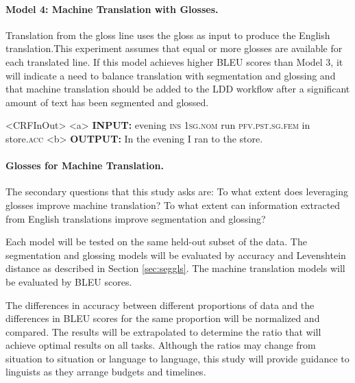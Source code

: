 \paragraph{Model 4: Machine Translation with Glosses.}

Translation from the gloss line uses the gloss as input to produce the English translation.This experiment assumes that equal or more glosses are available for each translated line. If this model achieves higher BLEU scores than Model 3, it will indicate a need to balance translation with segmentation and glossing and that machine translation should be added to the LDD workflow after a significant amount of text has been segmented and glossed. 

\begin{singlespace}
\pex<CRFInOut>   
\label{ex:FTgloss}
\a<a> \textbf{INPUT:} \hspace{5 mm} evening \textsc{ins} \textsc{1sg.nom} run \textsc{pfv.pst.sg.fem} in store.\textsc{acc}
\label{ex:FTglossIn}
\a<b> \textbf{OUTPUT:} \hspace{3 mm} In the evening I ran to the store.
\label{ex:FTglossOut}
\xe
\end{singlespace}


\paragraph{Glosses for Machine Translation.}
The secondary questions that this study asks are:
To what extent does leveraging glosses improve machine translation?  To what extent can information extracted from English translations improve segmentation and glossing?

Each model will be tested on the same held-out subset of the data. The segmentation and glossing models will be evaluated by accuracy and Levenshtein distance as described in Section \ref{sec:seggls}. The machine translation models will be evaluated by BLEU \cite{papineni_bleu:_2002} scores.  

The differences in accuracy between different proportions of data and the differences in BLEU scores for the same proportion will be normalized and compared. The results will be extrapolated to determine the ratio that will achieve optimal results on all tasks. 
Although the ratios may change from situation to situation or language to language, this study will provide guidance to linguists as they arrange budgets and timelines.  

